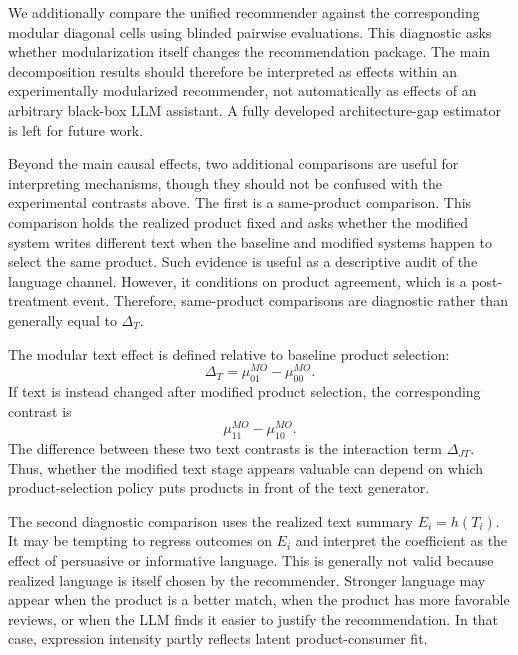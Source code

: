 \documentclass[11pt]{article}
\begin{document}
We additionally compare the unified recommender against the corresponding modular diagonal cells using blinded pairwise evaluations. This diagnostic asks whether modularization itself changes the recommendation package. The main decomposition results should therefore be interpreted as effects within an experimentally modularized recommender, not automatically as effects of an arbitrary black-box LLM assistant. A fully developed architecture-gap estimator is left for future work.

Beyond the main causal effects, two additional comparisons are useful for interpreting mechanisms, though they should not be confused with the experimental contrasts above. The first is a same-product comparison. This comparison holds the realized product fixed and asks whether the modified system writes different text when the baseline and modified systems happen to select the same product. Such evidence is useful as a descriptive audit of the language channel. However, it conditions on product agreement, which is a post-treatment event. Therefore, same-product comparisons are diagnostic rather than generally equal to $\Delta_T$.

The modular text effect is defined relative to baseline product selection:
\begin{equation*}
\Delta_T = \mu_{01}^{MO} - \mu_{00}^{MO}.
\end{equation*}
If text is instead changed after modified product selection, the corresponding contrast is
\begin{equation*}
\mu_{11}^{MO} - \mu_{10}^{MO}.
\end{equation*}
The difference between these two text contrasts is the interaction term $\Delta_{JT}$. Thus, whether the modified text stage appears valuable can depend on which product-selection policy puts products in front of the text generator.

The second diagnostic comparison uses the realized text summary $E_i = h(T_i)$. It may be tempting to regress outcomes on $E_i$ and interpret the coefficient as the effect of persuasive or informative language. This is generally not valid because realized language is itself chosen by the recommender. Stronger language may appear when the product is a better match, when the product has more favorable reviews, or when the LLM finds it easier to justify the recommendation. In that case, expression intensity partly reflects latent product-consumer fit.
\end{document}
